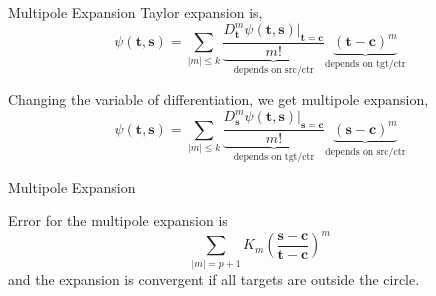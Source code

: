 \documentclass[10pt]{beamer}
\def\b#1{\mathbf{ #1}}
\begin{document}
\begin{frame}[fragile]{Multipole Expansion}
Taylor expansion is,
\[
 \psi(\b t, \b s) = \sum_{|m| \le k} \underbrace{\frac{D_{\b t}^m \psi(\b t, \b s)\Bigr|_{\b t = \b c}}{m!}}_{\text{depends on src/ctr}} \underbrace{(\b t - \b c)^m}_{\text{depends on tgt/ctr}}
\]

Changing the variable of differentiation, we get multipole expansion,
\[
 \psi(\b t, \b s) = \sum_{|m| \le k} \underbrace{\frac{D_{\b s}^m \psi(\b t, \b s)\Bigr|_{\b s = \b c}}{m!}}_{\text{depends on tgt/ctr}} \underbrace{(\b s - \b c)^m}_{\text{depends on src/ctr}}
\]
\end{frame}


\begin{frame}[fragile]{Multipole Expansion}

\begin{center}
\end{center}

Error for the multipole expansion is \[
  \sum_{|m| = p+1} K_m \left(\frac{\b s - \b c}{\b t-\b c}\right)^{m}
\]
and the expansion is convergent if all targets are outside the circle.
\end{frame}
\end{document}

